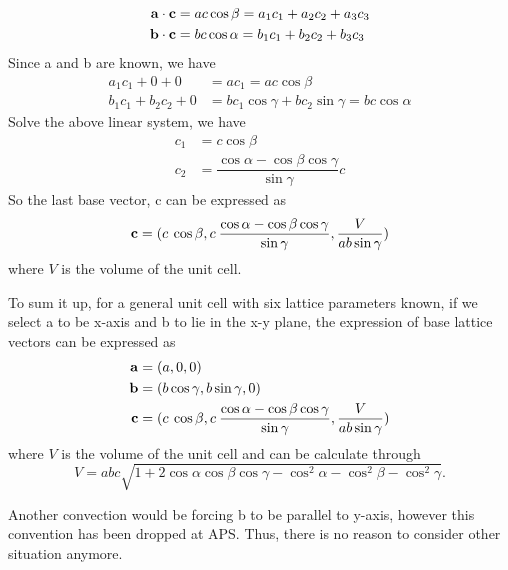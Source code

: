 \documentclass[12pt]{scrartcl}
\begin{document}
\begin{align*}
	\mathbf{a} \cdot \mathbf{c} &= ac\cos\beta   = a_1c_1 + a_2c_2 + a_3c_3 \\
	\mathbf{b} \cdot \mathbf{c} &= bc\cos\alpha = b_1c_1 + b_2c_2 + b_3c_3	
\end{align*}
Since \vctr a and \vctr b are known, we have
\begin{align*}
	a_1c_1 + 0 + 0 &= ac_1 = ac\cos\beta \\
	b_1c_1 + b_2c_2 + 0 &= bc_1\cos\gamma  + bc_2\sin\gamma  = bc\cos\alpha
\end{align*}
Solve the above linear system, we have
\begin{align*}
	c_1 &= c\cos\beta \\
	c_2 &= \dfrac{\cos\alpha - \cos\beta\cos\gamma}{\sin\gamma}c
\end{align*}
So the last base vector, \vctr c can be expressed as 
\[
	\mathbf{c} = ( c \: \cos\beta, 
	                c \: \dfrac{\cos\alpha - \cos\beta\cos\gamma}{\sin\gamma}, 
	                \dfrac{V}{ab\sin\gamma})
\]
where $V$ is the volume of the unit cell.

To sum it up, for a general unit cell with six lattice parameters known, if we select \vctr a to be x-axis and \vctr b to lie in the x-y plane, the expression of base lattice vectors can be expressed as 
\begin{align*}
	\mathbf{a} &= (a, 0, 0) \\
	\mathbf{b} &= (b\cos\gamma, b\sin\gamma, 0) \\
	\mathbf{c} &= ( c \: \cos\beta, 
	                c \: \dfrac{\cos\alpha - \cos\beta\cos\gamma}{\sin\gamma}, 
	                \dfrac{V}{ab\sin\gamma})
\end{align*}
where $V$ is the volume of the unit cell and can be calculate through
\[
	V = abc\sqrt{1 + 2\cos\alpha\cos\beta\cos\gamma - \cos^2\alpha-\cos^2\beta-\cos^2\gamma}.
\]

Another convection would be forcing \vctr b to be parallel to y-axis, however this convention has been dropped at APS.
Thus, there is no reason to consider other situation anymore.
\end{document}
